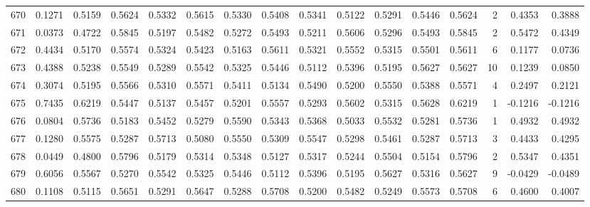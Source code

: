\begin{tabular}{lrrrrrrrrrrrrrrr}
670 &      0.1271 &  0.5159 &  0.5624 &  0.5332 &  0.5615 &  0.5330 &  0.5408 &  0.5341 &  0.5122 &  0.5291 &   0.5446 &     0.5624 &      2 &                    0.4353 &                     0.3888 \\
671 &      0.0373 &  0.4722 &  0.5845 &  0.5197 &  0.5482 &  0.5272 &  0.5493 &  0.5211 &  0.5606 &  0.5296 &   0.5493 &     0.5845 &      2 &                    0.5472 &                     0.4349 \\
672 &      0.4434 &  0.5170 &  0.5574 &  0.5324 &  0.5423 &  0.5163 &  0.5611 &  0.5321 &  0.5552 &  0.5315 &   0.5501 &     0.5611 &      6 &                    0.1177 &                     0.0736 \\
673 &      0.4388 &  0.5238 &  0.5549 &  0.5289 &  0.5542 &  0.5325 &  0.5446 &  0.5112 &  0.5396 &  0.5195 &   0.5627 &     0.5627 &     10 &                    0.1239 &                     0.0850 \\
674 &      0.3074 &  0.5195 &  0.5566 &  0.5310 &  0.5571 &  0.5411 &  0.5134 &  0.5490 &  0.5200 &  0.5550 &   0.5388 &     0.5571 &      4 &                    0.2497 &                     0.2121 \\
675 &      0.7435 &  0.6219 &  0.5447 &  0.5137 &  0.5457 &  0.5201 &  0.5557 &  0.5293 &  0.5602 &  0.5315 &   0.5628 &     0.6219 &      1 &                   -0.1216 &                    -0.1216 \\
676 &      0.0804 &  0.5736 &  0.5183 &  0.5452 &  0.5279 &  0.5590 &  0.5343 &  0.5368 &  0.5033 &  0.5532 &   0.5281 &     0.5736 &      1 &                    0.4932 &                     0.4932 \\
677 &      0.1280 &  0.5575 &  0.5287 &  0.5713 &  0.5080 &  0.5550 &  0.5309 &  0.5547 &  0.5298 &  0.5461 &   0.5287 &     0.5713 &      3 &                    0.4433 &                     0.4295 \\
678 &      0.0449 &  0.4800 &  0.5796 &  0.5179 &  0.5314 &  0.5348 &  0.5127 &  0.5317 &  0.5244 &  0.5504 &   0.5154 &     0.5796 &      2 &                    0.5347 &                     0.4351 \\
679 &      0.6056 &  0.5567 &  0.5270 &  0.5542 &  0.5325 &  0.5446 &  0.5112 &  0.5396 &  0.5195 &  0.5627 &   0.5316 &     0.5627 &      9 &                   -0.0429 &                    -0.0489 \\
680 &      0.1108 &  0.5115 &  0.5651 &  0.5291 &  0.5647 &  0.5288 &  0.5708 &  0.5200 &  0.5482 &  0.5249 &   0.5573 &     0.5708 &      6 &                    0.4600 &                     0.4007 \\

\end{tabular}
